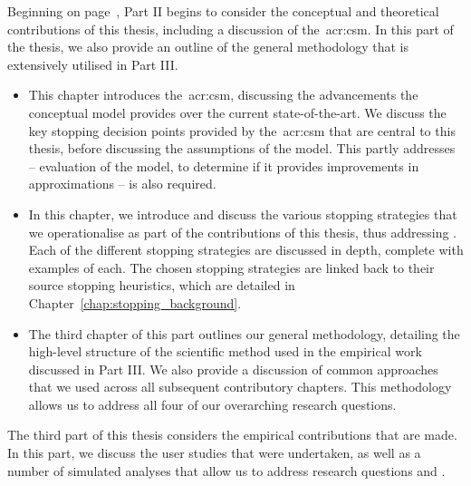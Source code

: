 \noindent
{} Beginning on page~\pageref{part:stopping}, Part II begins to consider the conceptual and theoretical contributions of this thesis, including a discussion of the~\gls{acr:csm}. In this part of the thesis, we also provide an outline of the general methodology that is extensively utilised in Part III.

\begin{itemize}
    \item[]{ This chapter introduces the~\gls{acr:csm}, discussing the advancements the conceptual model provides over the current state-of-the-art. We discuss the key stopping decision points provided by the~\gls{acr:csm} that are central to this thesis, before discussing the assumptions of the model. This partly addresses  -- evaluation of the model, to determine if it provides improvements in approximations -- is also required.}
    
    \item[]{ In this chapter, we introduce and discuss the various stopping strategies that we operationalise as part of the contributions of this thesis, thus addressing . Each of the different stopping strategies are discussed in depth, complete with examples of each. The chosen stopping strategies are linked back to their source stopping heuristics, which are detailed in Chapter~\ref{chap:stopping_background}.}
    
    \item[]{ The third chapter of this part outlines our general methodology, detailing the high-level structure of the scientific method used in the empirical work discussed in Part III. We also provide a discussion of common approaches that we used across all subsequent contributory chapters. This methodology allows us to address all four of our overarching research questions.}
\end{itemize}

\noindent
{}
The third part of this thesis considers the empirical contributions that are made. In this part, we discuss the user studies that were undertaken, as well as a number of simulated analyses that allow us to address research questions  and .

